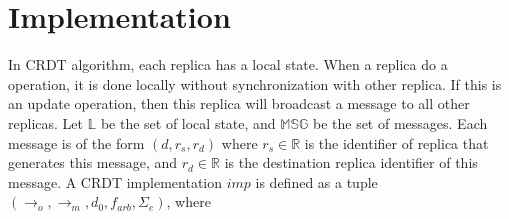 
\section{Implementation}
\label{sec:implementation}

{\color {red}In CRDT algorithm, each replica has a local state. When a replica do a operation, it is done locally without synchronization with other replica. If this is an update operation, then this replica will broadcast a message to all other replicas.} Let $\mathbb{L}$ be the set of local state, and $\mathbb{MSG}$ be the set of messages. Each message is of the form $(d,r_s,r_d)$ where $r_s \in \mathbb{R}$ is the identifier of replica that generates this message, and $r_d \in \mathbb{R}$ is the destination replica identifier of this message. A CRDT implementation $\mathit{imp}$ is defined as a tuple $(\rightarrow_o,\rightarrow_m,d_0,f_{\mathit{arb}}, \Sigma_e)$, where 

